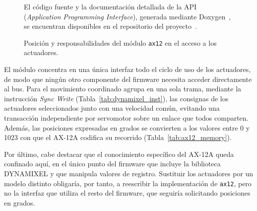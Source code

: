 \begin{figure}[H]
{}
    \captionsetup{justification=centering}
    \caption[Posición y responsabilidades del módulo \texttt{ax12}]
    {Posición y responsabilidades del módulo \texttt{ax12} en el acceso a los
    actuadores.}
    \label{fig:arquitectura_ax12}
    {\footnotesize El código fuente y la documentación detallada de la API (\textit{Application Programming Interface}),
    generada mediante Doxygen~\cite{doxygen}, se encuentran disponibles en el
    repositorio del proyecto~\cite{repositorio_hexapodo}.}
\end{figure}

El módulo concentra en una única interfaz todo el ciclo de uso de los
actuadores, de modo que ningún otro componente del firmware necesita acceder
directamente al bus. Para el movimiento coordinado agrupa en una sola trama,
mediante la instrucción \textit{Sync Write}
(Tabla~\ref{tab:dynamixel_inst}), las consignas de los actuadores seleccionados
junto con una velocidad común, evitando una transacción independiente por
servomotor sobre un enlace que todos comparten. Además, las posiciones
expresadas en grados se convierten a los valores entre 0 y 1023 con que el
AX-12A codifica su recorrido (Tabla~\ref{tab:ax12_memory}).

Por último, cabe destacar que el conocimiento específico del AX-12A queda confinado aquí, en el único punto del firmware que incluye la biblioteca DYNAMIXEL y que manipula valores de registro. Sustituir los actuadores por un modelo distinto obligaría, por tanto, a reescribir la implementación de \texttt{ax12}, pero no la interfaz que utiliza el resto del
firmware, que seguiría solicitando posiciones en grados.


